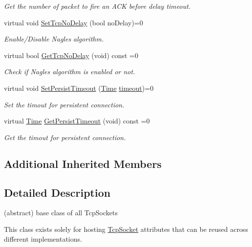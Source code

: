 \begin{DoxyCompactItemize}
\begin{DoxyCompactList}\small\item\em Get the number of packet to fire an A\+CK before delay timeout. \end{DoxyCompactList}\item 
virtual void \hyperlink{classns3_1_1TcpSocket_ad20148bb4389b28abb97e1020ce1b322}{Set\+Tcp\+No\+Delay} (bool no\+Delay)=0
\begin{DoxyCompactList}\small\item\em Enable/\+Disable Nagle\textquotesingle{}s algorithm. \end{DoxyCompactList}\item 
virtual bool \hyperlink{classns3_1_1TcpSocket_a155c876b87b89d2bbfc7e0e932a8604e}{Get\+Tcp\+No\+Delay} (void) const =0
\begin{DoxyCompactList}\small\item\em Check if Nagle\textquotesingle{}s algorithm is enabled or not. \end{DoxyCompactList}\item 
virtual void \hyperlink{classns3_1_1TcpSocket_a455616a87f286c5e8234640fbfee6f33}{Set\+Persist\+Timeout} (\hyperlink{classns3_1_1Time}{Time} \hyperlink{openflow-switch_8cc_a386d174ae121d1cfa279074b7e209714}{timeout})=0
\begin{DoxyCompactList}\small\item\em Set the timout for persistent connection. \end{DoxyCompactList}\item 
virtual \hyperlink{classns3_1_1Time}{Time} \hyperlink{classns3_1_1TcpSocket_a2b9492e7c80f37b4e74284f066a8a529}{Get\+Persist\+Timeout} (void) const =0
\begin{DoxyCompactList}\small\item\em Get the timout for persistent connection. \end{DoxyCompactList}\end{DoxyCompactItemize}
\subsection*{Additional Inherited Members}


\subsection{Detailed Description}
(abstract) base class of all Tcp\+Sockets 

This class exists solely for hosting \hyperlink{classns3_1_1TcpSocket}{Tcp\+Socket} attributes that can be reused across different implementations. 

